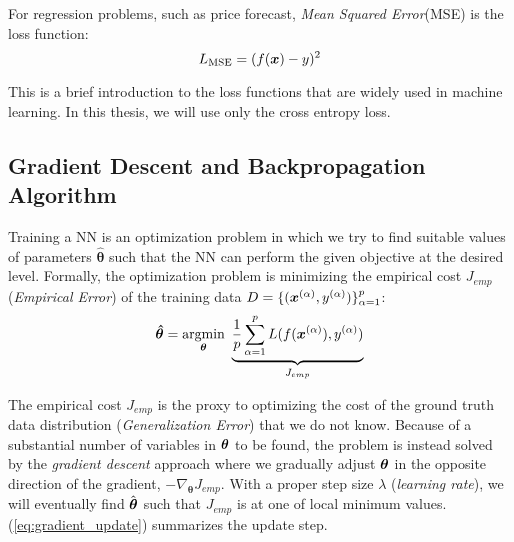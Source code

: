 

For regression problems, such as price forecast, \textit{Mean Squared Error}(MSE) is the loss function:
$$
L_{\text{MSE}} = (f(\boldsymbol{x}) - y)^2
$$

This is a brief introduction to the loss functions that are widely used in machine learning. In this thesis, we will use only the cross entropy loss.

\subsection{Gradient Descent and Backpropagation Algorithm} 
Training a NN is an optimization problem in which we try to find suitable values of parameters $\hat{\boldsymbol{\theta}}$ such that the NN can perform the given objective at the desired level. Formally, the optimization problem is minimizing the empirical cost $J_{emp}$ (\textit{Empirical Error}) of the training data $D=\{ (\xa, \ya) \}_{\alpha=1}^{p}$:
\begin{align} \label{eq:nn_opt}
	\patvector{\hat{\theta}} = \patarg{min}{\boldsymbol{\theta}} \underbrace{\frac{1}{p}  \sum_{\alpha=1}^p L( f(\xa), \ya) }_{J_{emp}}
\end{align}

The empirical cost $J_{emp}$ is the proxy to optimizing the cost of the ground truth data distribution (\textit{Generalization Error}) that we do not know. Because of a substantial number of  variables in $\patvector{\theta}$ to be found,  the problem is instead solved by the \textit{gradient descent} approach where we gradually adjust $\patvector{\theta}$ in the opposite direction of the gradient, $-\nabla_{\boldsymbol{\theta}} J_{emp}$. With a proper step size $\lambda$  (\textit{learning rate}), we will eventually find $\hat{\patvector{\theta}}$ such that $J_{emp}$ is at one of local minimum values. (\ref{eq:gradient_update}) summarizes the update step.


%
%
%

